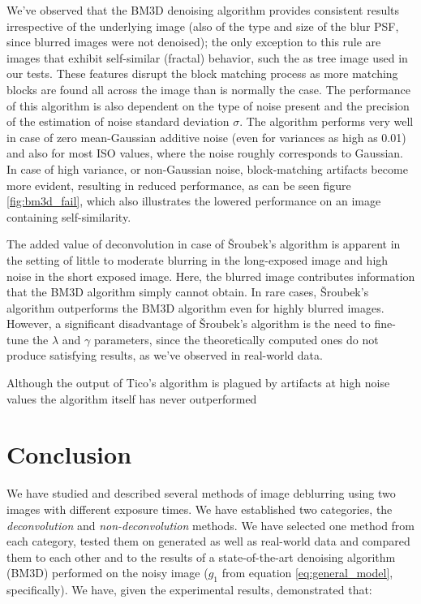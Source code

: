 \documentclass[12pt,notitlepage]{report}
\begin{document}
We've observed that the BM3D denoising algorithm provides consistent results irrespective of the underlying image (also of the type and size of the blur PSF, since blurred images were not denoised); the only exception to this rule are images that exhibit self-similar (fractal) behavior, such the as tree image used in our tests. These features disrupt the block matching process as more matching blocks are found all across the image than is normally the case. The performance of this algorithm is also dependent on the type of noise present and the precision of the estimation of noise standard deviation $\sigma$. The algorithm performs very well in case of zero mean-Gaussian additive noise (even for variances as high as 0.01) and also for most ISO values, where the noise roughly corresponds to Gaussian. In case of high variance, or non-Gaussian noise, block-matching artifacts become more evident, resulting in reduced performance, as can be seen figure \ref{fig:bm3d_fail}, which also illustrates the lowered performance on an image containing self-similarity. 



The added value of deconvolution in case of Šroubek's algorithm is apparent in the setting of little to moderate blurring in the long-exposed image and high noise in the short exposed image. Here, the blurred image contributes information that the BM3D algorithm simply cannot obtain. In rare cases, Šroubek's algorithm outperforms the BM3D algorithm even for highly blurred images. However, a significant disadvantage of Šroubek's algorithm is the need to fine-tune the $\lambda$ and $\gamma$ parameters, since the theoretically computed ones do not produce satisfying results, as we've observed in real-world data.



Although the output of Tico's algorithm is plagued by artifacts at high noise values the algorithm itself has never outperformed      



\chapter{Conclusion}

We have studied and described several methods of image deblurring using two images with different exposure times. We have established two categories, the {\em deconvolution} and {\em non-deconvolution} methods.  We have selected one method from each category, tested them on generated as well as real-world data and compared them to each other and to the results of a state-of-the-art denoising algorithm (BM3D) performed on the noisy image ($g_1$ from equation \ref{eq:general_model}, specifically). We have, given the experimental results, demonstrated that: 
\end{document}
